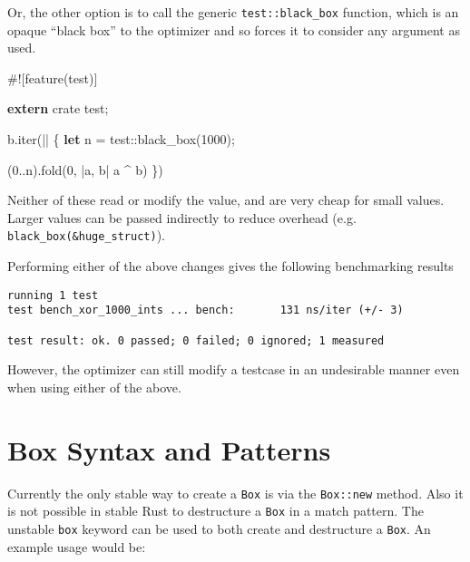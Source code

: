 \documentclass[a4paper,]{book}
\newenvironment{Shaded}{\begin{snugshade}}{\end{snugshade}}
\newcommand{\KeywordTok}[1]{\textcolor[rgb]{0.13,0.29,0.53}{\textbf{{#1}}}}
\newcommand{\DecValTok}[1]{\textcolor[rgb]{0.00,0.00,0.81}{{#1}}}
\newcommand{\NormalTok}[1]{{#1}}
\begin{document}
Or, the other option is to call the generic \texttt{test::black\_box}
function, which is an opaque ``black box'' to the optimizer and so
forces it to consider any argument as used.

\begin{Shaded}
\begin{Highlighting}[]
\NormalTok{#![feature(test)]}

\KeywordTok{extern} \NormalTok{crate test;}

\NormalTok{b.iter(|| \{}
    \KeywordTok{let} \NormalTok{n = test::black_box(}\DecValTok{1000}\NormalTok{);}

    \NormalTok{(}\DecValTok{0.}\NormalTok{.n).fold(}\DecValTok{0}\NormalTok{, |a, b| a ^ b)}
\NormalTok{\})}
\end{Highlighting}
\end{Shaded}

Neither of these read or modify the value, and are very cheap for small
values. Larger values can be passed indirectly to reduce overhead (e.g.
\texttt{black\_box(\&huge\_struct)}).

Performing either of the above changes gives the following benchmarking
results

\begin{verbatim}
running 1 test
test bench_xor_1000_ints ... bench:       131 ns/iter (+/- 3)

test result: ok. 0 passed; 0 failed; 0 ignored; 1 measured
\end{verbatim}

However, the optimizer can still modify a testcase in an undesirable
manner even when using either of the above.

\section{Box Syntax and Patterns}\label{sec--box-syntax-and-patterns}

Currently the only stable way to create a \texttt{Box} is via the
\texttt{Box::new} method. Also it is not possible in stable Rust to
destructure a \texttt{Box} in a match pattern. The unstable \texttt{box}
keyword can be used to both create and destructure a \texttt{Box}. An
example usage would be:
\end{document}
